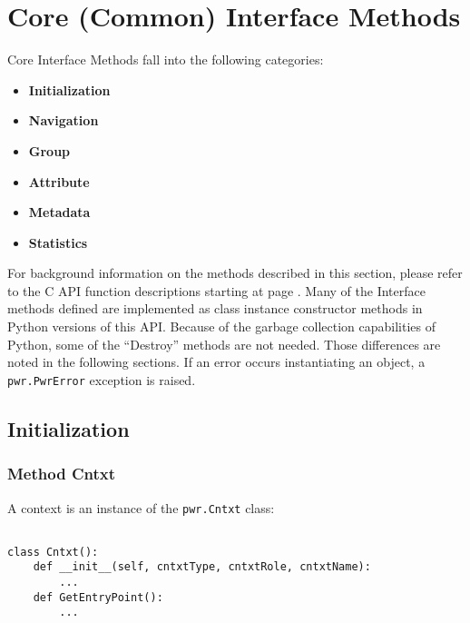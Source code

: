 \section{Core (Common) Interface Methods}
\label{sec:PythonCoreInterfaceFunctions}

Core Interface Methods fall into the following categories:
\begin{itemize}[noitemsep,nolistsep]
\item{\textbf{Initialization}}
\item{\textbf{Navigation}}
\item{\textbf{Group}}
\item{\textbf{Attribute}}
\item{\textbf{Metadata}}
\item{\textbf{Statistics}}
\end{itemize}

For background information on the methods described in this section, please refer to
the C API function descriptions starting at page \pageref{chap:Common}. Many of
the Interface methods defined are implemented as class instance constructor
methods in Python versions of this API. Because of the garbage collection
capabilities of Python, some of the ``Destroy'' methods are not needed. Those
differences are noted in the following sections. If an error occurs
instantiating an object, a \texttt{pwr.PwrError} exception is raised.

\subsection{Initialization} \label{sec:PythonInitialization}

\subsubsection{Method Cntxt} \label{meth:Cntxt}

A context is an instance of the \texttt{pwr.Cntxt} class:
\begin{center}\begin{minipage}{.95\linewidth}\begin{lstlisting}

class Cntxt():
    def __init__(self, cntxtType, cntxtRole, cntxtName):
        ...
    def GetEntryPoint():
        ...
\end{lstlisting}\end{minipage}\end{center}

